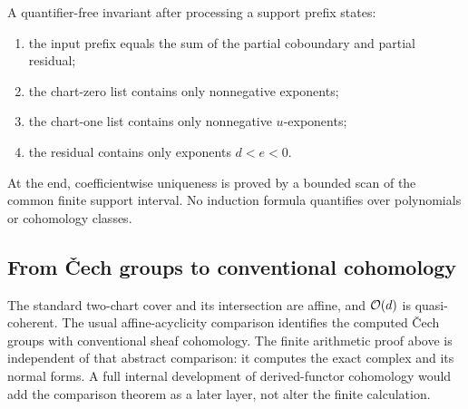 A quantifier-free invariant after processing a support prefix states:
\begin{enumerate}[label=(\roman*)]
\item the input prefix equals the sum of the partial coboundary and partial residual;
\item the chart-zero list contains only nonnegative exponents;
\item the chart-one list contains only nonnegative $u$-exponents;
\item the residual contains only exponents $d<e<0$.
\end{enumerate}
At the end, coefficientwise uniqueness is proved by a bounded scan of the common finite support
interval.  No induction formula quantifies over polynomials or cohomology classes.

\subsection{From \v{C}ech groups to conventional cohomology}

The standard two-chart cover and its intersection are affine, and $\mathcal O(d)$ is quasi-coherent.  The
usual affine-acyclicity comparison identifies the computed \v{C}ech groups with conventional sheaf
cohomology.  The finite arithmetic proof above is independent of that abstract comparison: it
computes the exact complex and its normal forms.  A full internal development of derived-functor
cohomology would add the comparison theorem as a later layer, not alter the finite calculation.
